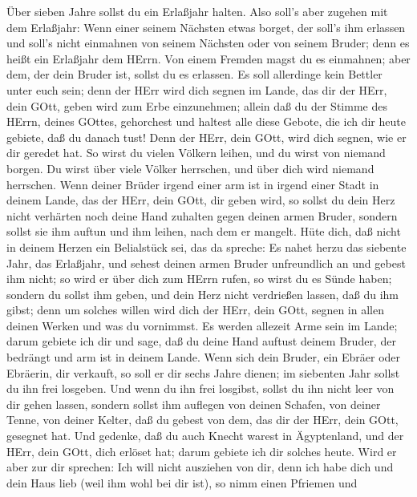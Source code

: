  Über sieben Jahre sollst du ein Erlaßjahr halten.
 Also soll's aber zugehen mit dem Erlaßjahr: Wenn einer
seinem Nächsten etwas borget, der soll's ihm erlassen und soll's nicht
einmahnen von seinem Nächsten oder von seinem Bruder; denn es heißt ein
Erlaßjahr dem HErrn.  Von einem Fremden magst du es
einmahnen; aber dem, der dein Bruder ist, sollst du es erlassen.
 Es soll allerdinge kein Bettler unter euch sein; denn der
HErr wird dich segnen im Lande, das dir der HErr, dein GOtt, geben wird
zum Erbe einzunehmen;  allein daß du der Stimme des HErrn,
deines GOttes, gehorchest und haltest alle diese Gebote, die ich dir
heute gebiete, daß du danach tust!  Denn der HErr, dein
GOtt, wird dich segnen, wie er dir geredet hat. So wirst du vielen
Völkern leihen, und du wirst von niemand borgen. Du wirst über viele
Völker herrschen, und über dich wird niemand herrschen. 
Wenn deiner Brüder irgend einer arm ist in irgend einer Stadt in deinem
Lande, das der HErr, dein GOtt, dir geben wird, so sollst du dein Herz
nicht verhärten noch deine Hand zuhalten gegen deinen armen Bruder,
 sondern sollst sie ihm auftun und ihm leihen, nach dem er
mangelt.  Hüte dich, daß nicht in deinem Herzen ein
Belialstück sei, das da spreche: Es nahet herzu das siebente Jahr, das
Erlaßjahr, und sehest deinen armen Bruder unfreundlich an und gebest ihm
nicht; so wird er über dich zum HErrn rufen, so wirst du es Sünde haben;
 sondern du sollst ihm geben, und dein Herz nicht
verdrießen lassen, daß du ihm gibst; denn um solches willen wird dich
der HErr, dein GOtt, segnen in allen deinen Werken und was du vornimmst.
 Es werden allezeit Arme sein im Lande; darum gebiete ich
dir und sage, daß du deine Hand auftust deinem Bruder, der bedrängt und
arm ist in deinem Lande.  Wenn sich dein Bruder, ein Ebräer
oder Ebräerin, dir verkauft, so soll er dir sechs Jahre dienen; im
siebenten Jahr sollst du ihn frei losgeben.  Und wenn du
ihn frei losgibst, sollst du ihn nicht leer von dir gehen lassen,
 sondern sollst ihm auflegen von deinen Schafen, von deiner
Tenne, von deiner Kelter, daß du gebest von dem, das dir der HErr, dein
GOtt, gesegnet hat.  Und gedenke, daß du auch Knecht warest
in Ägyptenland, und der HErr, dein GOtt, dich erlöset hat; darum gebiete
ich dir solches heute.  Wird er aber zur dir sprechen: Ich
will nicht ausziehen von dir, denn ich habe dich und dein Haus lieb
(weil ihm wohl bei dir ist),  so nimm einen Pfriemen und

